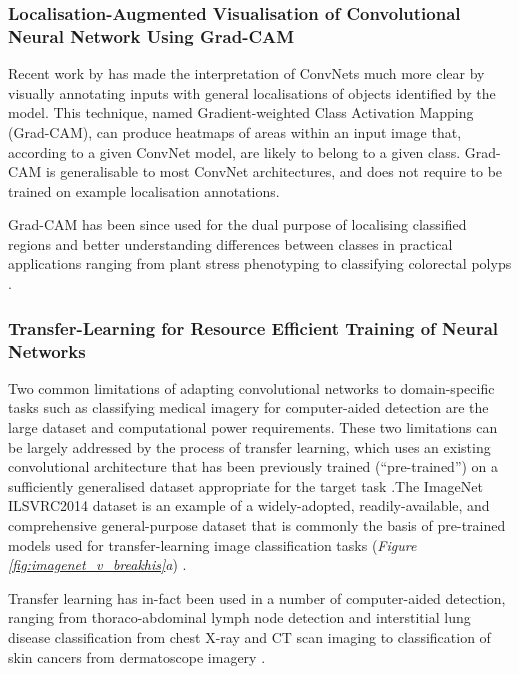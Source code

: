 \subsubsection{Localisation-Augmented Visualisation of Convolutional Neural Network Using Grad-CAM}

Recent work by \citeauthor{selvaraju2016} has made the interpretation of ConvNets much more clear by visually annotating inputs with general localisations of objects identified by the model. This technique, named Gradient-weighted Class Activation Mapping (Grad-CAM), can produce heatmaps of areas within an input image that, according to a given ConvNet model, are likely to belong to a given class. Grad-CAM is generalisable to most ConvNet architectures, and does not require to be trained on example localisation annotations.\par

Grad-CAM has been since used for the dual purpose of localising classified regions and better understanding differences between classes in practical applications ranging from plant stress phenotyping to classifying colorectal polyps \citep{ghosal2017,korbar2017}.\par

\subsubsection{Transfer-Learning for Resource Efficient Training of Neural Networks}

Two common limitations of adapting convolutional networks to domain-specific tasks such as classifying medical imagery for computer-aided detection are the large dataset and computational power requirements. These two limitations can be largely addressed by the process of transfer learning, which uses an existing convolutional architecture that has been previously trained (``pre-trained'') on a sufficiently generalised dataset appropriate for the target task \citep{transfer_learning_survey}.The ImageNet ILSVRC2014 dataset is an example of a widely-adopted, readily-available, and comprehensive general-purpose dataset that is commonly the basis of pre-trained models used for transfer-learning image classification tasks (\textit{Figure \ref{fig:imagenet_v_breakhis}a}) \citep{imagenet}.\par

Transfer learning has in-fact been used in a number of computer-aided detection, ranging from thoraco-abdominal lymph node detection and interstitial lung disease classification from chest X-ray and CT scan imaging to classification of skin cancers from dermatoscope imagery \citep{transfer_learning_lungs, transfer_learning_skin}.\par

